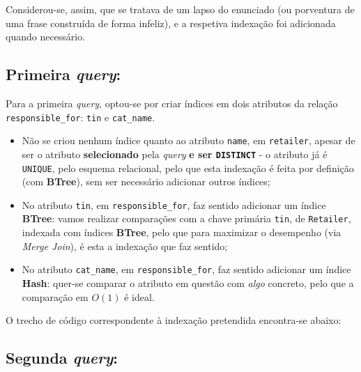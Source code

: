 \documentclass[12pt,a4paper]{article}
\begin{document}
Considerou-se, assim, que se tratava de um lapso do enunciado (ou porventura de uma
frase construída de forma infeliz), e a respetiva indexação foi adicionada quando necessário.

\subsection*{Primeira \textit{query}:}



Para a primeira \textit{query}, optou-se por criar índices em dois atributos da relação \texttt{responsible\_for}:
\texttt{tin} e \texttt{cat\_name}.

\vspace*{0.25cm}

\begin{itemize}
  \item Não se criou nenhum índice quanto ao atributo \texttt{name}, em \texttt{retailer},
        apesar de ser o atributo \textbf{selecionado} pela \textit{query} \textbf{e ser
          \texttt{DISTINCT}} - o atributo já é \texttt{UNIQUE}, pelo
        esquema relacional, pelo que esta indexação é feita por definição (com
        \textbf{BTree}), sem ser necessário adicionar outros índices;

  \item No atributo \texttt{tin}, em \texttt{responsible\_for}, faz sentido adicionar um
        índice \textbf{BTree}: vamos realizar comparações com a chave primária \texttt{tin},
        de \texttt{Retailer}, indexada com índices \textbf{BTree}, pelo que para maximizar
        o desempenho (via \textit{Merge Join}), é esta a indexação que faz sentido;

  \item No atributo \texttt{cat\_name}, em \texttt{responsible\_for}, faz sentido adicionar
        um índice \textbf{Hash}: quer-se comparar o atributo em questão com \textit{algo}
        concreto, pelo que a comparação em $O(1)$ é ideal.
\end{itemize}

O trecho de código correspondente à indexação pretendida encontra-se abaixo:



\subsection*{Segunda \textit{query}:}
\end{document}
